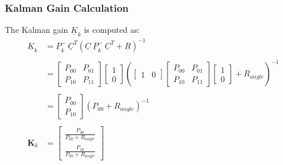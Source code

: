 \subsubsection{Kalman Gain Calculation}
The Kalman gain $\underline{K}_{k}$ is computed as:
$$
\begin{aligned}
	\underline{K}_{k} &= \underline{P}_{k}^- \ \underline{C}^T ( \underline{C} \ \underline{P}_{k}^-\ \underline{C}^T  +\underline{R})^{-1} \\
	\\
	&= 
	\begin{bmatrix} P_{00} & P_{01} \\ P_{10} & P_{11} \end{bmatrix} \begin{bmatrix} 1 \\ 0 \end{bmatrix}
	\left(
	\begin{bmatrix} 1 & 0 \end{bmatrix} 
	\begin{bmatrix} P_{00} & P_{01} \\ P_{10} & P_{11} \end{bmatrix}  
	\begin{bmatrix} 1 \\ 0 \end{bmatrix} 
	+ R_{angle}
	\right)^{-1} \\ \\
	&= 
	\begin{bmatrix} P_{00} \\ P_{10}\end{bmatrix}
	\left(
	P_{00}  
	+ R_{angle}
	\right)^{-1} \\ \\
	\mathbf{K}_k &= \begin{bmatrix} \frac{ P_{00} }{ P_{00}  
			+ R_{angle}} \\ \frac{ P_{10} }{ P_{00}  
			+ R_{angle}} \end{bmatrix}
\end{aligned}
$$


